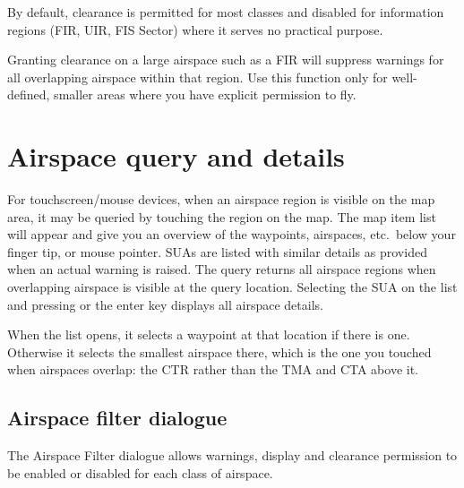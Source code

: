By default, clearance is permitted for most classes and disabled for
information regions (FIR, UIR, FIS Sector) where it serves no
practical purpose.

\warning Granting clearance on a large airspace such as a FIR will
suppress warnings for all overlapping airspace within that region.
Use this function only for well-defined, smaller areas where you have
explicit permission to fly.


\section{Airspace query and details}

For touchscreen/mouse devices, when an airspace region is visible on
the map area, it may be queried by touching the region on the map.  
The map item list will appear and give you an overview of the waypoints, 
airspaces, etc.\ below your finger tip, or mouse pointer.  SUAs are listed with
similar details as provided when an actual warning is raised.  
The query returns all airspace regions when overlapping airspace is visible at 
the query location.
Selecting the SUA on the list and pressing  or the enter key 
displays all airspace details. 

When the list opens, it selects a waypoint at that location if there
is one.  Otherwise it selects the smallest airspace there, which is the
one you touched when airspaces overlap: the CTR rather than the TMA
and CTA above it.



\subsection*{Airspace filter dialogue}\label{sec:airspace-filter}

The Airspace Filter dialogue allows warnings, display and clearance
permission to be enabled or disabled for each class of airspace.

